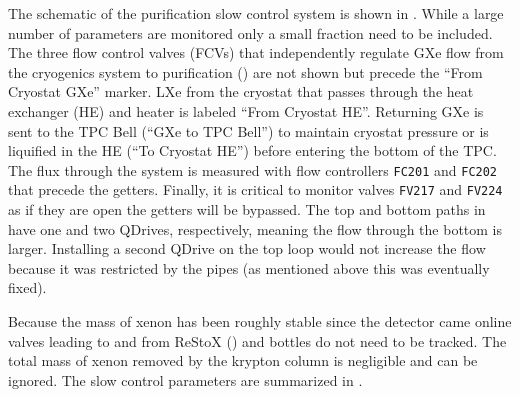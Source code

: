 The schematic of the purification slow control system is shown in .  While a large
number of parameters are monitored only a small fraction need to be included.  The three flow control valves (FCVs) that independently
regulate GXe flow from the cryogenics system to purification () are not shown but precede the
``From Cryostat GXe'' marker.  LXe from the cryostat that passes
through the heat exchanger (HE) and heater is labeled ``From Cryostat HE''.  Returning GXe is sent to the TPC Bell (``GXe to TPC Bell'')
to maintain cryostat pressure or is liquified in the HE (``To Cryostat HE'') before entering the bottom of the TPC.  The flux through the
system is
measured with flow controllers \texttt{FC201} and \texttt{FC202} that precede the getters.  Finally, it is critical to monitor valves
\texttt{FV217} and \texttt{FV224} as
if they are open the getters will be bypassed.  The top and bottom paths in  have one
and two QDrives, respectively, meaning the flow through the bottom is larger.  Installing a second QDrive on the top loop would not
increase the flow because it was restricted by the pipes (as mentioned above this was eventually fixed).

Because the mass of xenon has
been roughly stable since the detector came online valves
leading to and from ReStoX () and bottles do not need to be tracked.  The total mass of xenon removed by the
krypton column is negligible and
can be ignored.  The slow control parameters are summarized in .

\begin{table}
\centering
{}
\caption{Parameters queried from slow control system to calculate \fg and \fl.}
\label{tab:electron_lifetime_model_removal_slow_control_pars}
\end{table}

